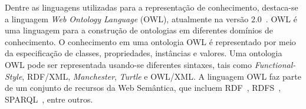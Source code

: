 Dentre as linguagens utilizadas para a representação de conhecimento, destaca-se a linguagem \textit{Web Ontology Language} (OWL), atualmente na versão 2.0~\cite{W3C-2012-OWL, W3C-2012-OWL-Primer}. OWL é uma linguagem para a construção de ontologias em diferentes domínios de conhecimento. O conhecimento em uma ontologia OWL é representado por meio da especificação de classes, propriedades, instâncias e valores. Uma ontologia OWL pode ser representada usando-se diferentes sintaxes, tais como \textit{Functional-Style}, RDF/XML, \textit{Manchester}, \textit{Turtle} e OWL/XML. A linguagem OWL faz parte de um conjunto de recursos da Web Semântica, que incluem RDF~\cite{W3C-2014-RDF}, RDFS~\cite{W3C-2007-RDFS}, SPARQL~\cite{W3C-2008-SPARQL}, entre outros.